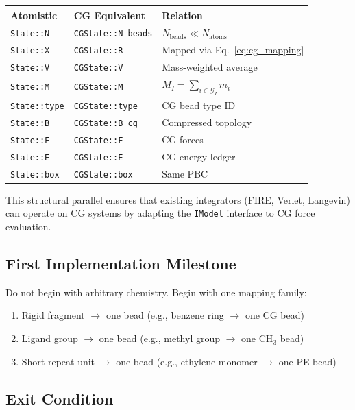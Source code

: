 \documentclass[11pt]{article}
\newcommand{\type}[1]{\texttt{#1}}
\newcommand{\field}[1]{\texttt{#1}}
\begin{document}
\begin{center}
\begin{tabular}{lll}
\toprule
\textbf{Atomistic} & \textbf{CG Equivalent} & \textbf{Relation} \\
\midrule
\field{State::N} & \field{CGState::N\_beads} & $N_\text{beads} \ll N_\text{atoms}$ \\
\field{State::X} & \field{CGState::R} & Mapped via Eq.~\ref{eq:cg_mapping} \\
\field{State::V} & \field{CGState::V} & Mass-weighted average \\
\field{State::M} & \field{CGState::M} & $M_I = \sum_{i \in \mathcal{G}_I} m_i$ \\
\field{State::type} & \field{CGState::type} & CG bead type ID \\
\field{State::B} & \field{CGState::B\_cg} & Compressed topology \\
\field{State::F} & \field{CGState::F} & CG forces \\
\field{State::E} & \field{CGState::E} & CG energy ledger \\
\field{State::box} & \field{CGState::box} & Same PBC \\
\bottomrule
\end{tabular}
\end{center}

This structural parallel ensures that existing integrators (FIRE, Verlet,
Langevin) can operate on CG systems by adapting the \type{IModel} interface
to CG force evaluation.

\subsection{First Implementation Milestone}

Do not begin with arbitrary chemistry.  Begin with one mapping family:

\begin{enumerate}
  \item Rigid fragment $\to$ one bead (e.g., benzene ring $\to$ one CG bead)
  \item Ligand group $\to$ one bead (e.g., methyl group $\to$ one CH$_3$ bead)
  \item Short repeat unit $\to$ one bead (e.g., ethylene monomer $\to$ one PE bead)
\end{enumerate}

\subsection{Exit Condition}
\end{document}
